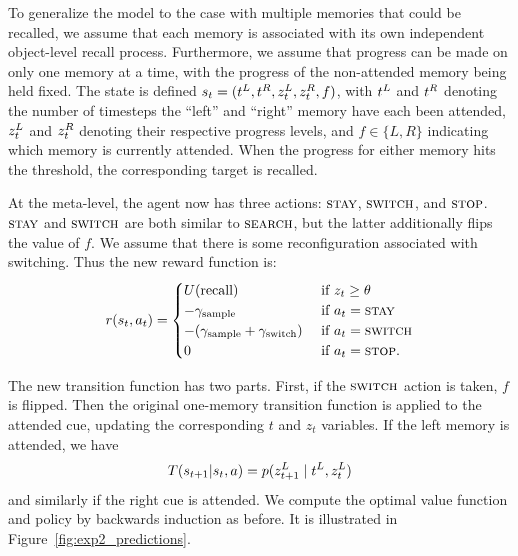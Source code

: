 
To generalize the model to the case with multiple memories that could be recalled, we assume that each memory is associated with its own independent object-level recall process. Furthermore, we assume that progress can be made on only one memory at a time, with the progress of the non-attended memory being held fixed. The state is defined $s_t = (t^{L}, t^{R}, z_t^{L}, z_t^{R}, f)$, with $t^{L}$ and $t^{R}$ denoting the number of timesteps the ``left'' and ``right'' memory have each been attended, $z_t^{L}$ and $z_t^{R}$ denoting their respective progress levels, and $f \in \{L, R\}$ indicating which memory is currently attended. When the progress for either memory hits the threshold, the corresponding target is recalled.

At the meta-level, the agent now has three actions: $\textsc{stay}$, $\textsc{switch}$, and $\textsc{stop}$. $\textsc{stay}$ and $\textsc{switch}$ are both similar to $\textsc{search}$, but the latter additionally flips the value of $f$. We assume that there is some reconfiguration associated with switching. Thus the new reward function is:
%
\begin{equation}\label{eq:reward2}
  r(s_t, a_t) = \begin{cases} 
    U({\text{recall}}) & \text{ if } z_t \geq \theta \\
    -\gamma_\text{sample} & \text{ if } a_t = \textsc{stay} \\
    -(\gamma_\text{sample} + \gamma_\text{switch})  & \text{ if } a_t = \textsc{switch} \\
    0 & \text{ if } a_t = \textsc{stop}.
  \end{cases}
\end{equation}

The new transition function has two parts. First, if the $\textsc{switch}$ action is taken, $f$ is flipped. Then the original one-memory transition function is applied to the attended cue, updating the corresponding $t$ and $z_t$ variables. If the left memory is attended, we have
%
\begin{equation}\label{eq:mem-transition2}
  T(s_{t+1} | s_t, a) = p(z_{t+1}^{L} \mid t^{L}, z_t^{L})
\end{equation}
and similarly if the right cue is attended. We compute the optimal value function and policy by backwards induction as before. It is illustrated in Figure~\ref{fig:exp2_predictions}.


